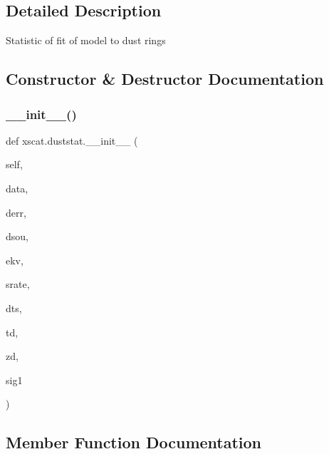 \subsection{Detailed Description}
\begin{DoxyVerb}Statistic of fit of model to dust rings\end{DoxyVerb}
 

\subsection{Constructor \& Destructor Documentation}
\mbox{\label{classxscat_1_1duststat_a11bd2557a5be1c5a3bb92d411ed755d3}} 
\subsubsection{\texorpdfstring{\+\_\+\+\_\+init\+\_\+\+\_\+()}{\_\_init\_\_()}}
{\footnotesize\ttfamily def xscat.\+duststat.\+\_\+\+\_\+init\+\_\+\+\_\+ (\begin{DoxyParamCaption}\item[{}]{self,  }\item[{}]{data,  }\item[{}]{derr,  }\item[{}]{dsou,  }\item[{}]{ekv,  }\item[{}]{srate,  }\item[{}]{dts,  }\item[{}]{td,  }\item[{}]{zd,  }\item[{}]{sig1 }\end{DoxyParamCaption})}



\subsection{Member Function Documentation}
\mbox{\label{classxscat_1_1duststat_a8db8ce37288e515751d744f72840fdea}} 
